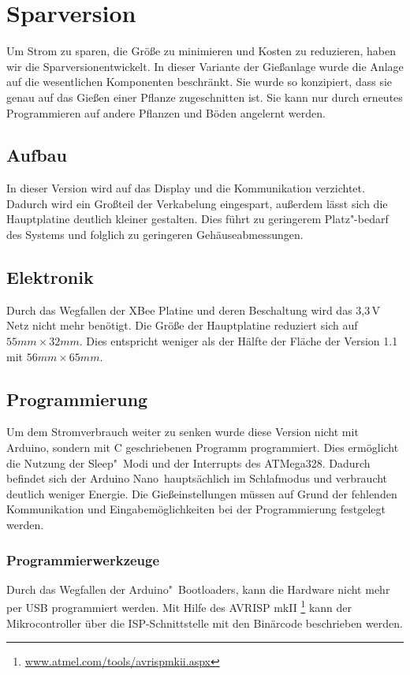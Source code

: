 
\section{Sparversion}
	Um Strom zu sparen, die Größe zu minimieren und Kosten zu reduzieren, haben wir die \glqq Sparversion\grqq entwickelt.
	In dieser Variante der Gießanlage wurde die Anlage auf die wesentlichen Komponenten beschränkt.
	Sie wurde so konzipiert, dass sie genau auf das Gießen einer Pflanze zugeschnitten ist.
	Sie kann nur durch erneutes Programmieren auf andere Pflanzen und Böden angelernt werden. 	
	\subsection{Aufbau}
	In dieser Version wird auf das Display und die Kommunikation verzichtet.
	Dadurch wird ein Großteil der Verkabelung eingespart, außerdem lässt sich die Hauptplatine deutlich kleiner gestalten.
	Dies führt zu geringerem Platz"-bedarf des Systems und folglich zu geringeren Gehäuseabmessungen.
	\subsection{Elektronik}
	Durch das Wegfallen der XBee Platine und deren Beschaltung wird das 3,3\,V Netz nicht mehr benötigt.
	Die Größe der Hauptplatine reduziert sich auf \begin{math} 55 mm \times 32 mm \end{math}.
	Dies entspricht weniger als der Hälfte der Fläche der Version 1.1 mit \begin{math} 56 mm \times 65 mm \end{math}.
	\subsection{Programmierung}
	Um dem Stromverbrauch weiter zu senken wurde diese Version nicht mit Arduino, sondern mit C geschriebenen Programm programmiert.
	Dies ermöglicht die Nutzung der Sleep"~Modi und der Interrupts des ATMega328.
	Dadurch befindet sich der \glqq Arduino Nano\grqq \ hauptsächlich im Schlafmodus und verbraucht deutlich weniger Energie.
	Die Gießeinstellungen müssen auf Grund der fehlenden Kommunikation und Eingabemöglichkeiten bei der Programmierung festgelegt werden.
	\subsubsection{Programmierwerkzeuge}
	Durch das Wegfallen der Arduino"~Bootloaders, kann die Hardware nicht mehr per USB programmiert werden. 
	Mit Hilfe des AVRISP mkII \footnote{\href{http://www.atmel.com/tools/avrispmkii.aspx}{www.atmel.com/tools/avrispmkii.aspx}} kann der Mikrocontroller über die ISP-Schnittstelle mit den Binärcode beschrieben werden. 

